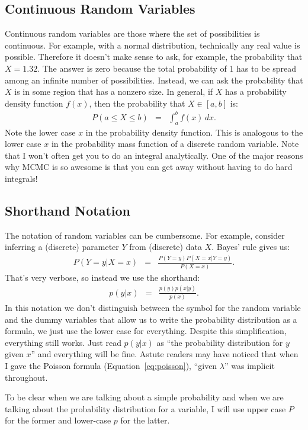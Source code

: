 \subsection{Continuous Random Variables}
Continuous random variables are those where the set of possibilities is
continuous. For example, with a normal distribution, technically any real value
is possible. Therefore it doesn't make sense to ask, for example, the probability
that $X=1.32$. The answer is zero because the total probability of 1 has to be
spread among an infinite number of possibilities. Instead, we can ask the probability
that $X$ is in some region that has a nonzero size. In general, if $X$ has a
probability density function $f(x)$, then the probability that $X \in [a, b]$ is:
\begin{eqnarray}
P(a \leq X \leq b) &=& \int_a^b f(x) \, dx.
\end{eqnarray}
Note the lower case $x$ in the probability density function. This is analogous
to the lower case $x$ in the probability mass function of a discrete random
variable. Note that I won't often get you to do an integral analytically. One
of the major reasons why MCMC is so awesome is that you can get away without
having to do hard integrals!

\subsection{Shorthand Notation}
The notation of random variables can be cumbersome. For example, consider
inferring a (discrete) parameter $Y$ from (discrete) data $X$. Bayes' rule gives us:
\begin{eqnarray}
P(Y=y | X=x) &=& \frac{P(Y=y)P(X=x|Y=y)}{P(X=x)}.
\end{eqnarray}
That's very verbose, so instead we use the shorthand:
\begin{eqnarray}
p(y | x) &=& \frac{p(y)p(x|y)}{p(x)}.
\end{eqnarray}
In this notation we don't distinguish between the symbol for the random variable
and the dummy variables that allow us to write the probability distribution as
a formula, we just use the lower case for everything. Despite this simplification,
everything still works. Just read
$p(y|x)$ as ``the probability distribution for $y$ given $x$'' and everything
will be fine. Astute readers may have noticed that when I gave the Poisson formula
(Equation~\ref{eq:poisson}), ``given $\lambda$'' was implicit throughout.

To be clear when we are talking about a simple probability and when we are
talking about the probability distribution for a variable, I will use upper case
$P$ for the former and lower-case $p$ for the latter.

